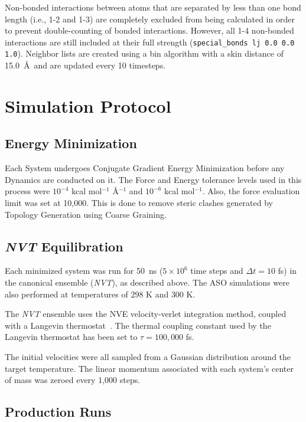 Non-bonded interactions between atoms that are separated by less than one bond length (i.e., 1-2 and 1-3) are completely excluded from being calculated in order to prevent double-counting of bonded interactions. However, all 1-4 non-bonded interactions are still included at their full strength (\texttt{special\_bonds lj 0.0 0.0 1.0}). Neighbor lists are created using a bin algorithm with a skin distance of 15.0~\AA\ and are updated every 10 timesteps.




\section{Simulation Protocol}
\label{sec:sim_protocol}

\subsection{Energy Minimization}

Each System undergoes Conjugate Gradient Energy Minimization before any Dynamics are conducted on it. The Force and Energy tolerance levels used in this process were $10^{-4}$ kcal mol$^{-1}$ \AA$^{-1}$ and $10^{-6}$ kcal mol$^{-1}$. Also, the force evaluation limit was set at 10,000. This is done to remove steric clashes generated by Topology Generation using Coarse Graining.

\subsection{\textit{NVT} Equilibration}
Each minimized system was run for 50~ns ($5 \times 10^{6}$ time steps and $\Delta t=10$ fs) in the canonical ensemble (\textit{NVT}), as described above. The ASO simulations were also performed at temperatures of $298$ K and $300$ K.

The \textit{NVT} ensemble uses the NVE velocity-verlet integration method, coupled with a Langevin thermostat~\cite{Schneider1978}. The thermal coupling constant used by the Langevin thermostat has been set to $\tau = 100,000$ fs.

The initial velocities were all sampled from a Gaussian distribution around the target temperature. The linear momentum associated with each system's center of mass was zeroed every 1,000 steps.

\subsection{Production Runs}
\label{sec:production}

